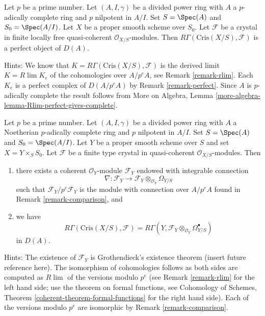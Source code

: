 \begin{remark}
\label{remark-complete-perfect}
Let $p$ be a prime number. Let $(A, I, \gamma)$ be a divided power
ring with $A$ a $p$-adically complete ring and $p$ nilpotent in $A/I$. Set
$S = \Spec(A)$ and $S_0 = \Spec(A/I)$. Let $X$ be a proper
smooth scheme over $S_0$. Let $\mathcal{F}$ be a crystal in
finite locally free quasi-coherent $\mathcal{O}_{X/S}$-modules.
Then $R\Gamma(\text{Cris}(X/S), \mathcal{F})$ is a
perfect object of $D(A)$.

\medskip\noindent
Hints: We know that $K = R\Gamma(\text{Cris}(X/S), \mathcal{F})$
is the derived limit $K = R\lim K_e$ of the cohomologies over $A/p^eA$,
see Remark \ref{remark-rlim}.
Each $K_e$ is a perfect complex of $D(A/p^eA)$ by
Remark \ref{remark-perfect}.
Since $A$ is $p$-adically complete the result
follows from
More on Algebra, Lemma \ref{more-algebra-lemma-Rlim-perfect-gives-complete}.
\end{remark}

\begin{remark}
\label{remark-complete-comparison}
Let $p$ be a prime number. Let $(A, I, \gamma)$ be a divided power
ring with $A$ a Noetherian $p$-adically complete ring and $p$ nilpotent
in $A/I$. Set $S = \Spec(A)$ and
$S_0 = \Spec(A/I)$. Let $Y$ be a proper smooth scheme over $S$ and set
$X = Y \times_S S_0$. Let $\mathcal{F}$ be a finite type crystal in
quasi-coherent $\mathcal{O}_{X/S}$-modules. Then
\begin{enumerate}
\item there exists a coherent $\mathcal{O}_Y$-module $\mathcal{F}_Y$
endowed with integrable connection
$$
\nabla :
\mathcal{F}_Y
\longrightarrow
\mathcal{F}_Y \otimes_{\mathcal{O}_Y} \Omega_{Y/S}
$$
such that $\mathcal{F}_Y/p^e\mathcal{F}_Y$ is the module with connection
over $A/p^eA$ found in Remark \ref{remark-comparison}, and
\item we have
$$
R\Gamma(\text{Cris}(X/S), \mathcal{F}) =
R\Gamma(Y, \mathcal{F}_Y \otimes_{\mathcal{O}_Y} \Omega^\bullet_{Y/S})
$$
in $D(A)$.
\end{enumerate}

\medskip\noindent
Hints: The existence of $\mathcal{F}_Y$ is Grothendieck's existence theorem
(insert future reference here). The isomorphism of cohomologies follows
as both sides are computed as $R\lim$ of the versions modulo $p^e$
(see Remark \ref{remark-rlim} for the left hand side; use the theorem
on formal functions, see
Cohomology of Schemes, Theorem \ref{coherent-theorem-formal-functions}
for the right hand side).
Each of the versions modulo $p^e$ are isomorphic by
Remark \ref{remark-comparison}.
\end{remark}




